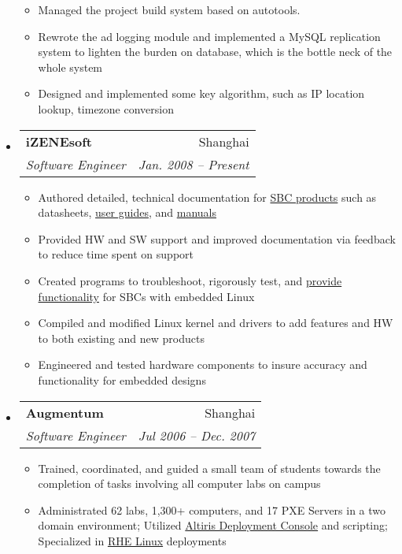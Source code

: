 \documentclass[letterpaper,11pt]{article}
\makeatletter
\newcommand{\resitem}[1]{\item #1 \vspace{-2pt}}
\newcommand{\ressubheading}[4]{
\begin{tabular*}{6.5in}{l@{\extracolsep{\fill}}r}
  \textbf{#1} & #2 \\
  \textit{#3} & \textit{#4} \\
\end{tabular*}\vspace{-6pt}}
\makeatother
\begin{document}
\begin{itemize}
{\begin{itemize}
      \resitem{Managed the project build system based on autotools.}

      \resitem{Rewrote the ad logging module and implemented a MySQL replication
        system to lighten the burden on database, which is the bottle neck of
        the whole system}
      
      \resitem{Designed and implemented some key algorithm, such as IP location
        lookup, timezone conversion}

    \end{itemize}
  }

\item \ressubheading{iZENEsoft}{Shanghai}{Software Engineer}{Jan. 2008 -- Present}
  { \footnotesize
    \begin{itemize}
      \resitem{Authored detailed, technical documentation for \href{http://www.embeddedarm.com/products/index.php}{SBC products} such as datasheets,  \href{http://www.embeddedarm.com/about/resource.php?item=410}{user guides}, and \href{http://www.embeddedarm.com/about/resource.php?item=409}{manuals}}

      \resitem{Provided HW and SW support and improved documentation via feedback to reduce time spent on support}
  
      \resitem{Created programs to troubleshoot, rigorously test, and \href{ftp://ftp.embeddedarm.com/ts-arm-sbc/ts-7500-linux/samples/sbus.c}{provide functionality} for SBCs with embedded Linux}
  
      \resitem{Compiled and modified Linux kernel and drivers to add features and HW to both existing and new products}
  
      \resitem{Engineered and tested hardware components to insure accuracy and functionality for embedded designs}
    \end{itemize}
  }

\item \ressubheading{Augmentum}{Shanghai}{Software Engineer}{Jul 2006 -- Dec. 2007}
  { \footnotesize
    \begin{itemize}
      \resitem{Trained, coordinated, and guided a small team of students towards the completion of tasks involving all computer labs on campus}

      \resitem{Administrated 62 labs, 1,300+ computers, and 17 PXE Servers in a two domain environment;  Utilized \href{http://www.symantec.com/business/deployment-solution}{Altiris Deployment Console} and scripting;  Specialized in \href{http://www.redhat.com/rhel/}{RHE Linux} deployments}


\end{itemize}}
\end{itemize}
\end{document}
